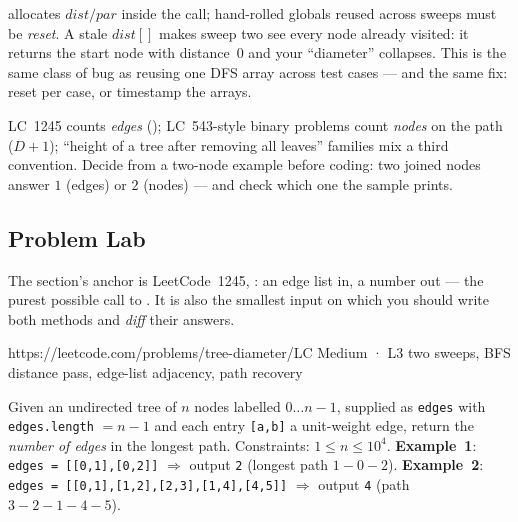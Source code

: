 \begin{warningbox}
 allocates $\mathit{dist}/\mathit{par}$ inside the call; hand-rolled
globals reused across sweeps must be \emph{reset}. A stale $\mathit{dist}[]$ makes sweep
two see every node already visited: it returns the start node with distance~$0$ and your
``diameter'' collapses. This is the same class of bug as reusing one DFS array across
test cases --- and the same fix: reset per case, or timestamp the arrays.
\end{warningbox}

\begin{warningbox}
LC~1245 counts \emph{edges} (); LC~543-style binary problems count
\emph{nodes} on the path ($D+1$); ``height of a tree after removing all leaves'' families
mix a third convention. Decide from a two-node example before coding: two joined nodes
answer $1$ (edges) or $2$ (nodes) --- and check which one the sample prints.
\end{warningbox}

\subsection{Problem Lab}

The section's anchor is LeetCode~1245, : an edge list in, a number
out --- the purest possible call to . It is also the smallest
input on which you should write both methods and \emph{diff} their answers.

  {https://leetcode.com/problems/tree-diameter/}{LC Medium · L3}
  {two sweeps, BFS distance pass, edge-list adjacency, path recovery}

\begin{problemstatement}
Given an undirected tree of $n$ nodes labelled $0 \dots n{-}1$, supplied as
\texttt{edges} with \texttt{edges.length} $= n-1$ and each entry
\texttt{[a,b]} a unit-weight edge, return the \emph{number of edges} in the longest
path. Constraints: $1 \le n \le 10^4$.
\textbf{Example~1}: \texttt{edges = [[0,1],[0,2]]} $\Rightarrow$ output \texttt{2}
(longest path $1-0-2$). \textbf{Example~2}: \texttt{edges =
[[0,1],[1,2],[2,3],[1,4],[4,5]]} $\Rightarrow$ output \texttt{4} (path $3-2-1-4-5$).
\end{problemstatement}


